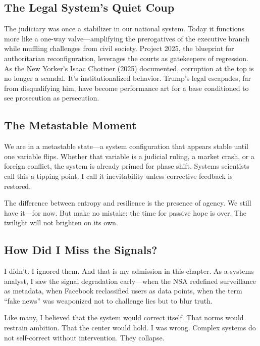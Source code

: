 \subsection{The Legal System's Quiet
Coup}\label{the-legal-systems-quiet-coup}

The judiciary was once a stabilizer in our national system. Today it
functions more like a one-way valve---amplifying the prerogatives of the
executive branch while muffling challenges from civil society. Project
2025, the blueprint for authoritarian reconfiguration, leverages the
courts as gatekeepers of regression. As the New Yorker's Isaac Chotiner
(2025) documented, corruption at the top is no longer a scandal. It's
institutionalized behavior. Trump's legal escapades, far from
disqualifying him, have become performance art for a base conditioned to
see prosecution as persecution.

\subsection{The Metastable Moment}\label{the-metastable-moment}

We are in a metastable state---a system configuration that appears
stable until one variable flips. Whether that variable is a judicial
ruling, a market crash, or a foreign conflict, the system is already
primed for phase shift. Systems scientists call this a tipping point. I
call it inevitability unless corrective feedback is restored.

The difference between entropy and resilience is the presence of agency.
We still have it---for now. But make no mistake: the time for passive
hope is over. The twilight will not brighten on its own.

\subsection{How Did I Miss the
Signals?}\label{how-did-i-miss-the-signals}

I didn't. I ignored them. And that is my admission in this chapter. As a
systems analyst, I saw the signal degradation early---when the NSA
redefined surveillance as metadata, when Facebook reclassified users as
data points, when the term ``fake news'' was weaponized not to challenge
lies but to blur truth.

Like many, I believed that the system would correct itself. That norms
would restrain ambition. That the center would hold. I was wrong.
Complex systems do not self-correct without intervention. They collapse.

